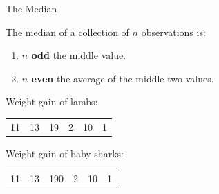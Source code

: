 \begin{frame}{The Median}

    The \alert{median} of a collection of $n$ observations
    is:
    \begin{enumerate}
        \item \textbf{$n$ odd} the middle value.
        \item \textbf{$n$ even} the average of the middle two values.
    \end{enumerate}

    \vspace{3em}
    \pause

     Weight gain of lambs:
    \begin{center}
        \begin{tabular}{cccccc}
            11 & 13 & 19 & 2 & 10 & 1
        \end{tabular}
    \end{center}

    \pause

    \vspace{3em}

     Weight gain of baby sharks:
    \begin{center}
        \begin{tabular}{cccccc}
            11 & 13 & 190 & 2 & 10 & 1
        \end{tabular}
    \end{center}

\end{frame}


